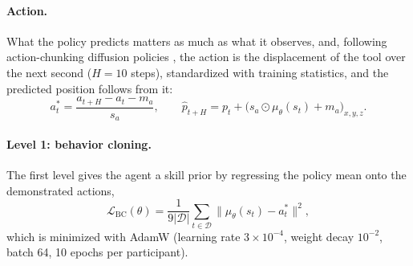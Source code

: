 \documentclass[utf8]{frontiers_suppmat}
\begin{document}
\paragraph*{Action.} What the policy predicts matters as much as what it observes, and, following action-chunking diffusion policies \cite{chi2023diffusion,kim2024srt}, the action is the displacement of the tool over the next second ($H=10$ steps), standardized with training statistics, and the predicted position follows from it:
\begin{equation}\label{eq:target}
a^*_t=\frac{a_{t+H}-a_t-m_a}{s_a},\qquad \hat p_{t+H}=p_t+\big(s_a\odot\mu_\theta(s_t)+m_a\big)_{x,y,z}.
\end{equation}

\paragraph*{Level 1: behavior cloning.} The first level gives the agent a skill prior by regressing the policy mean onto the demonstrated actions,
\begin{equation}\label{eq:bc}
\mathcal L_{\mathrm{BC}}(\theta)=\frac1{9|\mathcal D|}\sum_{t\in\mathcal D}\big\|\mu_\theta(s_t)-a^*_t\big\|^{2},
\end{equation}
which is minimized with AdamW (learning rate $3\times10^{-4}$, weight decay $10^{-2}$, batch 64, 10 epochs per participant).
\end{document}
